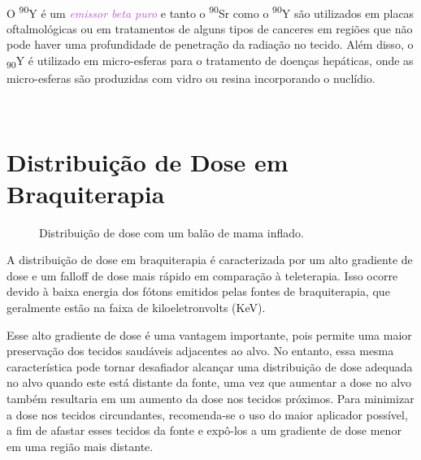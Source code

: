 \documentclass[11pt,a4paper]{article}
\begin{document}
		\

			O \textsuperscript{90}Y é um \textit{\textcolor{MediumOrchid}{emissor beta puro}} e tanto o \textsuperscript{90}Sr como o \textsuperscript{90}Y são utilizados em placas oftalmológicas ou em tratamentos de alguns tipos de canceres em regiões que não pode haver uma profundidade de penetração da radiação no tecido. Além disso, o \textsubscript{90}Y é utilizado em micro-esferas para o tratamento de doenças hepáticas, onde as micro-esferas são produzidas com vidro ou resina incorporando o nuclídio.

		\

\section{Distribuição de Dose em Braquiterapia}

\begin{figure}
	\centering
	\caption{Distribuição de dose com um balão de mama inflado.}
	\label{img:DistribuicaoDoseBalao}
\end{figure}

	A distribuição de dose em braquiterapia é caracterizada por um alto gradiente de dose e um falloff de dose mais rápido em comparação à teleterapia. Isso ocorre devido à baixa energia dos fótons emitidos pelas fontes de braquiterapia, que geralmente estão na faixa de kiloeletronvolts (KeV).


	Esse alto gradiente de dose é uma vantagem importante, pois permite uma maior preservação dos tecidos saudáveis adjacentes ao alvo. No entanto, essa mesma característica pode tornar desafiador alcançar uma distribuição de dose adequada no alvo quando este está distante da fonte, uma vez que aumentar a dose no alvo também resultaria em um aumento da dose nos tecidos próximos. Para minimizar a dose nos tecidos circundantes, recomenda-se o uso do maior aplicador possível, a fim de afastar esses tecidos da fonte e expô-los a um gradiente de dose menor em uma região mais distante.
	
\end{document}
